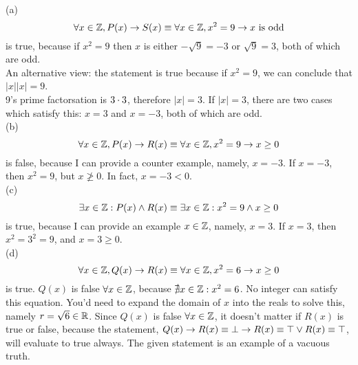 \documentclass[a4paper, 11pt]{report}
\begin{document}
\sol (a)
$$
  \forall x\in\mathbb{Z},P(x)\rightarrow S(x) \equiv \forall x\in\mathbb{Z}, x^2=9\rightarrow x\text{ is odd}
$$
is true, because if $x^2 = 9$ then $x$ is either $-\sqrt{9}=-3$ or $\sqrt{9}=3$, both of which are odd. \\
An alternative view: the statement is true because if $x^2 = 9$, we can conclude that $|x||x| = 9$.\\ 9's prime factorsation is $3\cdot3$, therefore $|x|=3$. If $|x|=3$, there are two cases which satisfy this: $x=3$ and $x=-3$, both of which are odd. \\

\sol (b)
$$
  \forall x\in\mathbb{Z}, P(x) \rightarrow R(x) \equiv \forall x\in\mathbb{Z}, x^2=9\rightarrow x\geq 0
$$
is false, because I can provide a counter example, namely, $x=-3$. If $x=-3$, then $x^2=9$, but $x\not\geq0$. In fact, $x=-3 < 0$. \\

\sol (c)
$$
  \exists x\in\mathbb{Z}: P(x)\land R(x) \equiv \exists x\in\mathbb{Z}: x^2 = 9 \land x\geq 0 
$$
is true, because I can provide an example $x\in\mathbb{Z}$, namely, $x=3$. If $x=3$, then $x^2=3^2=9$, and $x=3\geq0$. \\

\sol (d)
$$
  \forall x\in\mathbb{Z}, Q(x)\rightarrow R(x) \equiv \forall x\in\mathbb{Z}, x^2 = 6\rightarrow x\geq 0
$$
is true. $Q(x)$ is false $\forall x\in\mathbb{Z}$, because $\nexists x\in\mathbb{Z}:x^2 = 6$. No integer can satisfy this equation. You'd need to expand the domain of $x$ into the reals to solve this, namely $r=\sqrt{6}\in\mathbb{R}$. Since $Q(x)$ is false $\forall x\in\mathbb{Z}$, it doesn't matter if $R(x)$ is true or false, because the statement, $Q(x)\rightarrow R(x)\equiv\bot\rightarrow R(x)\equiv\top\lor R(x)\equiv \top$, will evaluate to true always. The given statement is an example of a vacuous truth. \\
\end{document}
